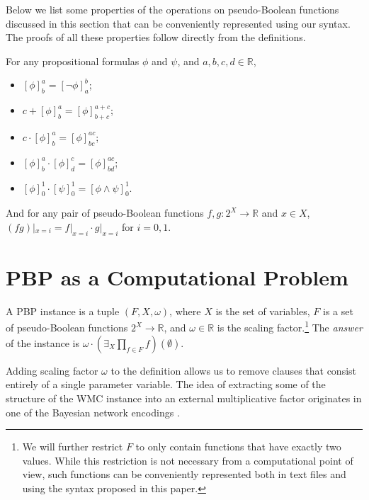 \documentclass[runningheads]{llncs}
\begin{document}
Below we list some properties of the operations on pseudo-Boolean functions
discussed in this section that can be conveniently represented using our syntax.
The proofs of all these properties follow directly from the definitions.

\begin{proposition} \label{prop:basic}
  For any propositional formulas $\phi$ and $\psi$, and $a, b, c, d \in
  \mathbb{R}$,
  \begin{itemize}
  \item $[\phi]^a_b = [\neg \phi]^b_a$;
  \item $c + [\phi]^a_b = [\phi]^{a+c}_{b+c}$;
  \item $c \cdot [\phi]^a_b = [\phi]^{ac}_{bc}$;
  \item $[\phi]^a_b \cdot [\phi]^c_d = [\phi]^{ac}_{bd}$;
  \item $[\phi]^1_0 \cdot [\psi]_0^1 = [\phi \land \psi]_0^1$.
  \end{itemize}
  And for any pair of pseudo-Boolean functions $f, g \colon 2^X \to \mathbb{R}$
  and $x \in  X$, $(fg)|_{x=i} = f|_{x=i} \cdot g|_{x=i}$ for $i = 0, 1$.
\end{proposition}

\section{PBP as a Computational Problem}

\begin{definition} \label{def:new_wmc}
  A PBP instance is a tuple $(F, X, \omega)$, where $X$ is the set of variables,
  $F$ is a set of pseudo-Boolean functions $2^X \to \mathbb{R}$, and $\omega \in
  \mathbb{R}$ is the scaling factor.\footnote{We will further restrict $F$ to
    only contain functions that have exactly two values. While this restriction
    is not necessary from a computational point of view, such functions can be
    conveniently represented both in text files and using the syntax proposed in
    this paper.} The \emph{answer} of the instance is $\omega \cdot
  \left(\exists_X\prod_{f \in F}f\right)(\emptyset)$.
\end{definition}

\begin{remark}
  Adding scaling factor $\omega$ to the definition allows us to remove
  clauses that consist entirely of a single parameter variable. The idea of
  extracting some of the structure of the WMC instance into an external
  multiplicative factor originates in one of the Bayesian network encodings
  \cite{DBLP:conf/ecai/BartKLM16}.
\end{remark}
\end{document}
